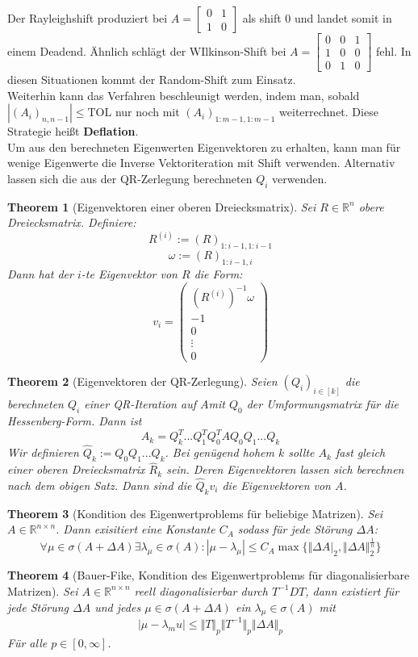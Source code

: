 \documentclass[10pt,a4paper]{article}
\newtheorem{theorem}{Theorem}
\begin{document}
	Der Rayleighshift produziert bei $A=\begin{bmatrix}
		0 & 1 \\
		1 & 0 
	\end{bmatrix}$ als shift $0$ und landet somit in einem Deadend. Ähnlich schlägt der WIlkinson-Shift bei $A=\begin{bmatrix}
		0 & 0 & 1\\
		1 & 0 & 0 \\
		0 & 1 & 0
	\end{bmatrix}$ fehl. In diesen Situationen kommt der Random-Shift zum Einsatz. \\
	Weiterhin kann das Verfahren beschleunigt werden, indem man, sobald $|(A_i)_{n, n-1}| \leq \text{TOL}$ nur noch mit $(A_i)_{1:m-1, 1:m-1}$ weiterrechnet. Diese Strategie heißt \textbf{Deflation}. \\
	Um aus den berechneten Eigenwerten Eigenvektoren zu erhalten, kann man für wenige Eigenwerte die Inverse Vektoriteration mit Shift verwenden. Alternativ lassen sich die aus der QR-Zerlegung berechneten $Q_i$ verwenden.
	\begin{theorem}[Eigenvektoren einer oberen Dreiecksmatrix]
		Sei $R\in \mathbb{R}^n$ obere Dreiecksmatrix. Definiere:
		$$R^{(i)} := (R)_{1:i-1,1:i-1}$$
		$$\omega := (R)_{1:i-1,i}$$
		Dann hat der $i$-te Eigenvektor von $R$ die Form:
		$$v_i = \begin{pmatrix}
			(R^{(i)})^{-1}\omega \\
			-1 \\
			0 \\
			\vdots \\
			0
		\end{pmatrix}$$ 
	\end{theorem}
	\begin{theorem}[Eigenvektoren der QR-Zerlegung]
		Seien $(Q_i)_{i\in[k]}$ die berechneten $Q_i$ einer QR-Iteration auf $A$mit $Q_0$ der Umformungsmatrix für die Hessenberg-Form. Dann ist $$A_k = Q_k^T...Q_1^TQ_0^TAQ_0Q_1...Q_k$$
		Wir definieren $\hat{Q}_k := Q_0Q_1...Q_k$. Bei genügend hohem $k$ sollte $A_k$ fast gleich einer oberen Dreiecksmatrix $\hat{R}_k$ sein. Deren Eigenvektoren lassen sich berechnen nach dem obigen Satz. Dann sind die $\hat{Q}_kv_i$ die Eigenvektoren von $A$.
	\end{theorem}
	\begin{theorem}[Kondition des Eigenwertproblems für beliebige Matrizen]
		Sei $A\in \mathbb{R}^{n\times n}$. Dann exisitiert eine Konstante  $C_A$ sodass für jede Störung $\Delta A$: 
		$$\forall \mu \in \sigma(A+\Delta A) \exists \lambda_\mu\in \sigma(A): |\mu - \lambda_\mu| \leq C_A \max \{\Vert\Delta A\vert_2, \Vert \Delta A\Vert_2^{\frac{1}{n}}\}$$
	\end{theorem}
	\begin{theorem}[Bauer-Fike, Kondition des Eigenwertproblems für diagonalisierbare Matrizen]
		Sei $A\in \mathbb{R}^{n\times n}$ reell diagonalisierbar durch $T^{-1}DT$, dann existiert für jede Störung $\Delta A$ und jedes $\mu \in \sigma(A+\Delta A)$ ein $\lambda_\mu\in \sigma(A)$ mit
		$$|\mu-\lambda_mu|\leq \Vert T\Vert_p\Vert T^{-1}\Vert_p\Vert\Delta A\Vert_p$$
		Für alle $p \in [0, \infty]$.
	\end{theorem}
\end{document}

